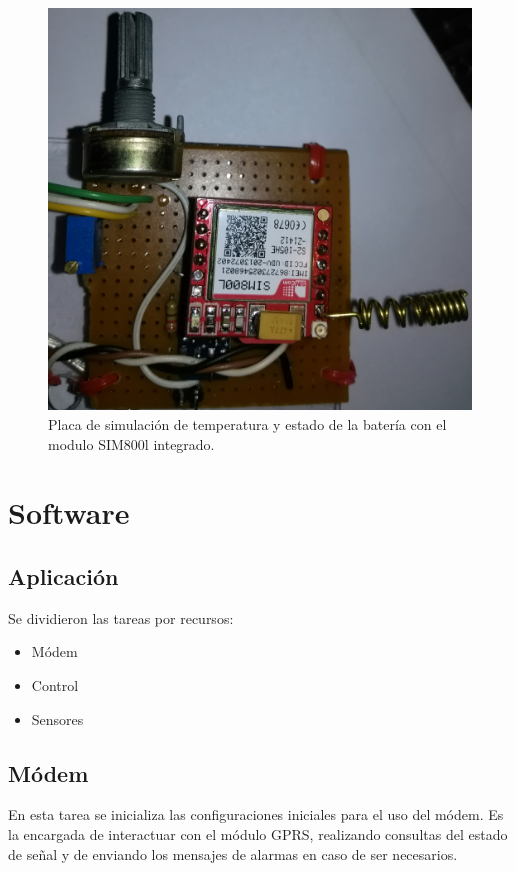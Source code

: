 \begin{figure}[!h]
  \centering
  \includegraphics[scale=.03]{./Figures/placa_basica.jpg}
  \caption{Placa de simulación de temperatura y estado de la batería con el modulo SIM800l integrado.}
  \label{fig:placa_básicafirst}
\end{figure}


\section{Software}
\subsection{Aplicación}
Se dividieron las tareas por recursos:
\begin{itemize}
  \item Módem 
  \item Control
  \item Sensores
\end{itemize}

\subsection*{Módem}
En esta tarea se inicializa las configuraciones iniciales para el uso del módem. Es la encargada de interactuar con el módulo GPRS, realizando consultas del estado de señal y de enviando los mensajes de alarmas en caso de ser necesarios.

